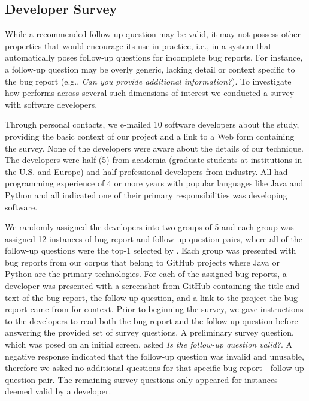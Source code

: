 \subsection{Developer Survey}
While a recommended follow-up question may be valid, it may not possess other properties that would
encourage its use in practice, i.e., in a system that automatically poses follow-up questions for incomplete bug reports. For
instance, a follow-up question may be overly generic, lacking detail or context specific to the bug report (e.g., {\em Can you provide
additional information?}). To investigate how \evpi performs across several such dimensions of interest we conducted a survey with
software developers.

Through personal contacts, we e-mailed 10 software developers about the study, providing the basic context of our project
and a link to a Web form containing the survey. None of the developers were
aware about the details of our technique. The developers were half (5) from academia (graduate students at
institutions in the U.S. and Europe) and half professional developers from industry. All had programming
experience of 4 or more years with popular languages like Java and Python and all indicated one of their primary
responsibilities was developing software.

We randomly assigned the developers into two groups of 5 and each group was assigned 12 instances of bug report and follow-up question pairs, where all of the follow-up questions were the top-1 selected by \evpi. Each group was presented with bug reports from our corpus that belong to GitHub projects where Java or Python are the primary technologies. For each of the assigned bug reports, a developer
was presented with a screenshot from GitHub containing the title and text of the bug report, the follow-up question, and a link to the project the bug report came from for context. Prior to beginning the survey, we gave instructions to the developers to read both the bug report and the follow-up question before answering the provided set of survey questions. A preliminary survey question, which was posed on an initial screen, asked {\em Is the follow-up question valid?}. A negative response indicated that the follow-up question was invalid and unusable, therefore we asked no additional questions for that specific bug report - follow-up question pair. The remaining survey questions only appeared for instances deemed valid by a developer.

